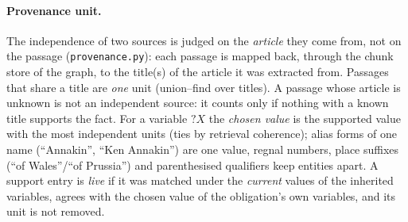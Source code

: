 \paragraph{Provenance unit.} The independence of two sources is judged on the \emph{article} they come from, not on the passage
(\texttt{provenance.py}): each passage is mapped back, through the chunk store of the graph, to the title(s) of the article it was extracted from.
Passages that share a title are \emph{one} unit (union--find over titles). A passage whose article is unknown is not an independent source: it counts
only if nothing with a known title supports the fact. For a variable $?X$ the \emph{chosen value} is the supported value with the most
independent units (ties by retrieval coherence); alias forms of one name (``Annakin'', ``Ken Annakin'') are one value, regnal numbers, place suffixes
(``of Wales''/``of Prussia'') and parenthesised qualifiers keep entities apart. A support entry is \emph{live} if it was matched under the
\emph{current} values of the inherited variables, agrees with the chosen value of the obligation's own variables, and its unit is not removed.

